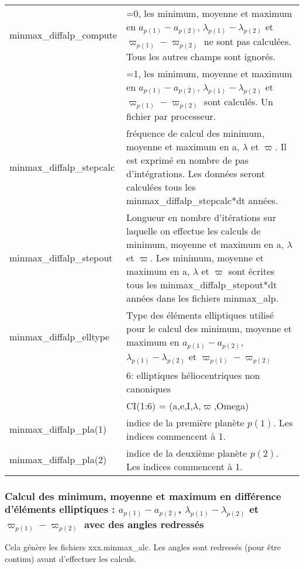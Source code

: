 \documentclass[11pt]{article}
\begin{document}
\begin{tabularx}{\textwidth}{|l|X|}
\hline
minmax\_diffalp\_compute  & =0, les minimum, moyenne et maximum en  $a_{p(1)}-a_{p(2)}$, $\lambda_{p(1)}-\lambda_{p(2)}$ et $\varpi_{p(1)}-\varpi_{p(2)}$ ne sont pas calcul\'ees. Tous les autres champs sont ignor\'es.\\
&=1, les minimum, moyenne et maximum en  $a_{p(1)}-a_{p(2)}$, $\lambda_{p(1)}-\lambda_{p(2)}$ et $\varpi_{p(1)}-\varpi_{p(2)}$ sont calcul\'es. Un fichier par processeur.\\ \hline
minmax\_diffalp\_stepcalc   & fr\'equence de calcul des minimum, moyenne et maximum en a, $\lambda$ et $\varpi$. Il est exprim\'e en nombre de pas d'int\'egrations. Les donn\'ees seront calcul\'ees tous les minmax\_diffalp\_stepcalc*dt ann\'ees.\\ \hline

minmax\_diffalp\_stepout   &Longueur en nombre d'it\'erations sur laquelle on effectue les calculs de minimum, moyenne et maximum en a, $\lambda$ et $\varpi$. Les minimum, moyenne et maximum en a, $\lambda$ et $\varpi$ sont \'ecrites tous les minmax\_diffalp\_stepout*dt ann\'ees dans les fichiers minmax\_alp. \\ \hline
minmax\_diffalp\_elltype  & Type des \'el\'ements elliptiques utilis\'e pour le calcul des  minimum, moyenne et maximum en $a_{p(1)}-a_{p(2)}$, $\lambda_{p(1)}-\lambda_{p(2)}$ et $\varpi_{p(1)}-\varpi_{p(2)}$ \\
&6:  elliptiques h\'eliocentriques non canoniques\\
&	     CI(1:6) = (a,e,I,$\lambda$,$\varpi$,Omega)\\ \hline
minmax\_diffalp\_pla(1)   & indice de la premi\`ere plan\`ete $p(1)$. Les indices commencent \`a 1.\\ \hline
minmax\_diffalp\_pla(2)   & indice de la deuxi\`eme plan\`ete $p(2)$. Les indices commencent \`a  1.\\ \hline
 \end{tabularx}

\vspace{0.5cm}
\subsubsection*{Calcul des minimum, moyenne et maximum en diff\'erence d'\'el\'ements elliptiques : $a_{p(1)}-a_{p(2)}$, $\lambda_{p(1)}-\lambda_{p(2)}$ et $\varpi_{p(1)}-\varpi_{p(2)}$ avec des angles redressés}
Cela g\'en\`ere les fichiers xxx.minmax\_alc.
Les angles sont redressés (pour être continu) avant d'effectuer les calculs. 
\end{document}
